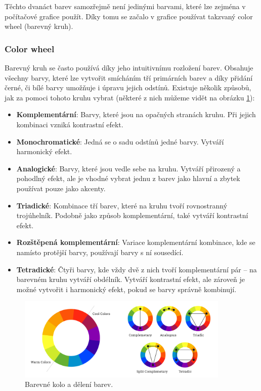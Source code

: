 Těchto dvanáct barev samozřejmě není jedinými barvami, které lze zejména v počítačové grafice použít. Díky tomu se začalo v grafice používat takzvaný color wheel (barevný kruh).\cite{color_theory_design}

\subsubsection*{Color wheel}
Barevný kruh se často používá díky jeho intuitivnímu rozložení barev. Obsahuje všechny barvy, které lze vytvořit smícháním tří primárních barev a díky přidání černé, či bílé barvy umožňuje i úpravu jejich odstínů. Existuje několik způsobů, jak za pomoci tohoto kruhu vybrat (některé z nich můžeme vidět na obrázku \ref{fig:color_theory}):\cite{color_wheel,color_schemes}
\begin{itemize}
    \item \textbf{Komplementární}: Barvy, které jsou na opačných stranách kruhu. Při jejich kombinaci vzniká kontrastní efekt.
    \item \textbf{Monochromatické}: Jedná se o sadu odstínů jedné barvy. Vytváří harmonický efekt.
    \item \textbf{Analogické}: Barvy, které jsou vedle sebe na kruhu. Vytváří přirozený a pohodlný efekt, ale je vhodné vybrat jednu z barev jako hlavní a zbytek používat pouze jako akcenty.
    \item \textbf{Triadické}: Kombinace tří barev, které na kruhu tvoří rovnostranný trojúhelník. Podobně jako způsob komplementární, také vytváří kontrastní efekt.
    \item \textbf{Rozštěpená komplementární}: Variace komplementární kombinace, kde se namísto protější barvy, používají barvy s ní sousedící. 
    \item \textbf{Tetradické}: Čtyři barvy, kde vždy dvě z nich tvoří komplementární pár -- na barevném kruhu vytváří obdélník. Vytváří kontrastní efekt, ale zároveň je možné vytvořit i harmonický efekt, pokud se barvy správně kombinují.
\end{itemize}

\begin{figure}[H]
    \centering
    \includegraphics[width=0.9\textwidth]{resources/figures/color_theory.png}
    \caption{Barevné kolo a dělení barev.\cite{color_schemes}}
    \label{fig:color_theory}
\end{figure}

